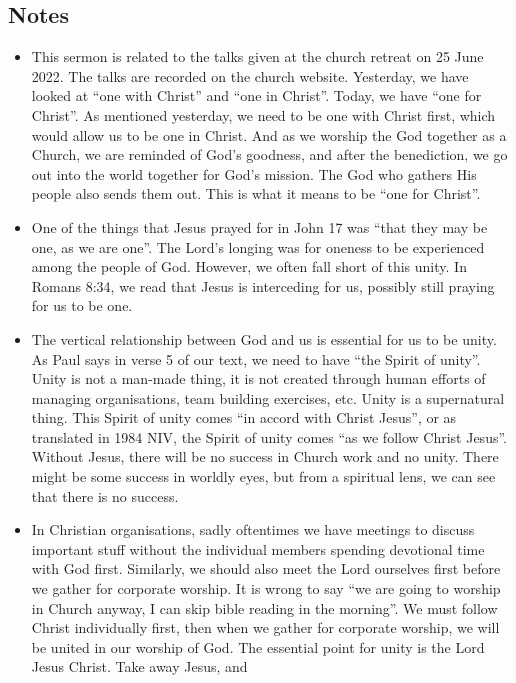 \subsection*{Notes}
\begin{itemize}
  \item{This sermon is related to the talks given at the church retreat on 25
  June 2022.  The talks are recorded on the church website.  Yesterday, we
  have looked at ``one with Christ'' and ``one in Christ''.  Today, we have
  ``one for Christ''.  As mentioned yesterday, we need to be one with Christ
  first, which would allow us to be one in Christ.  And as we worship the God
  together as a Church, we are reminded of God's goodness, and after the
  benediction, we go out into the world together for God's mission.  The God
  who gathers His people also sends them out.  This is what it means to be
  ``one for Christ''.}
  \item{One of the things that Jesus prayed for in John 17 was ``that they
  may be one, as we are one''.  The Lord's longing was for oneness to be
  experienced among the people of God.  However, we often fall short of this
  unity.  In Romans 8:34, we read that Jesus is interceding for us, possibly
  still praying for us to be one.}
  \item{The vertical relationship between God and us is essential for us to
  be unity.  As Paul says in verse 5 of our text, we need to have ``the
  Spirit of unity''.  Unity is not a man-made thing, it is not created
  through human efforts of managing organisations, team building exercises,
  etc.  Unity is a supernatural thing.  This Spirit of unity comes ``in
  accord with Christ Jesus'', or as translated in 1984 NIV, the Spirit of
  unity comes ``as we follow Christ Jesus''.  Without Jesus, there will be no
  success in Church work and no unity.  There might be some success in
  worldly eyes, but from a spiritual lens, we can see that there is no
  success. }
  \item{ In Christian organisations, sadly oftentimes we have meetings to
  discuss important stuff without the individual members spending devotional
  time with God first.  Similarly, we should also meet the Lord ourselves
  first before we gather for corporate worship.  It is wrong to say ``we are
  going to worship in Church anyway, I can skip bible reading in the
  morning''.  We must follow Christ individually first, then when we gather
  for corporate worship, we will be united in our worship of God.  The
  essential point for unity is the Lord Jesus Christ.  Take away Jesus, and
}
\end{itemize}
